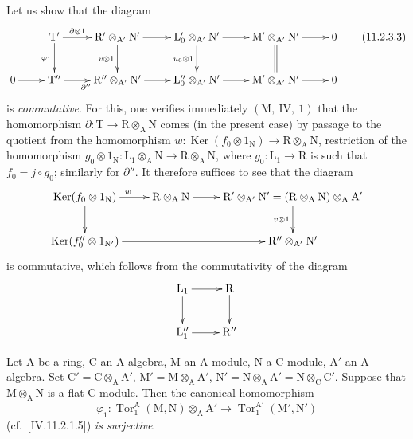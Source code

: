 
Let us show that the diagram
\begin{equation}
\xymatrix{
  & \mathrm{T}' \ar[r]^-{\partial\otimes 1} \ar[d]_{\varphi_1} & \mathrm{R}'\otimes_{\mathrm{A}'}\mathrm{N}' \ar[r] \ar[d]_{v\otimes 1} & \mathrm{L}'_0\otimes_{\mathrm{A}'}\mathrm{N}' \ar[r] \ar[d]_{u_0\otimes 1} & \mathrm{M}'\otimes_{\mathrm{A}'}\mathrm{N}' \ar[r] \ar@{=}[d] & 0 \\
  0 \ar[r] & \mathrm{T}'' \ar[r]_{\partial''} & \mathrm{R}''\otimes_{\mathrm{A}'}\mathrm{N}' \ar[r] & \mathrm{L}''_0\otimes_{\mathrm{A}'}\mathrm{N}' \ar[r] & \mathrm{M}'\otimes_{\mathrm{A}'}\mathrm{N}' \ar[r] & 0
}
  \label{IV.11.2.3.3}
\tag{11.2.3.3}
\end{equation}
is \emph{commutative}. For this, one verifies immediately $(\mathrm{M},~\mathrm{IV},~1)$ that the homomorphism $\partial:\mathrm{T}\to\mathrm{R}\otimes_\mathrm{A}\mathrm{N}$ comes (in the present case) by passage to the quotient from the homomorphism $w:\operatorname{Ker}(f_0\otimes 1_\mathrm{N})\to\mathrm{R}\otimes_\mathrm{A}\mathrm{N}$, restriction of the homomorphism $g_0\otimes 1_\mathrm{N}:\mathrm{L}_1\otimes_\mathrm{A}\mathrm{N}\to\mathrm{R}\otimes_\mathrm{A}\mathrm{N}$, where $g_0:\mathrm{L}_1\to\mathrm{R}$ is such that $f_0=j\circ g_0$; similarly for $\partial''$. It therefore suffices to see that the diagram
\[
\xymatrix{
  \operatorname{Ker}(f_0\otimes 1_\mathrm{N}) \ar[r]^{w} \ar[d] & \mathrm{R}\otimes_\mathrm{A}\mathrm{N} \ar[r] & \mathrm{R}'\otimes_{\mathrm{A}'}\mathrm{N}'=(\mathrm{R}\otimes_\mathrm{A}\mathrm{N})\otimes_\mathrm{A}\mathrm{A}' \ar[d]_{v\otimes 1} \\
  \operatorname{Ker}(f''_0\otimes 1_{\mathrm{N}'}) \ar[rr] & & \mathrm{R}''\otimes_{\mathrm{A}'}\mathrm{N}'
}
\]
is commutative, which follows from the commutativity of the diagram
\[
\xymatrix{
  \mathrm{L}_1 \ar[r] \ar[d] & \mathrm{R} \ar[d] \\
  \mathrm{L}''_1 \ar[r] & \mathrm{R}''
}
\]

\begin{lemma}[11.2.4]
\label{IV.11.2.4}
Let $\mathrm{A}$ be a ring, $\mathrm{C}$ an $\mathrm{A}$-algebra, $\mathrm{M}$ an $\mathrm{A}$-module, $\mathrm{N}$ a $\mathrm{C}$-module, $\mathrm{A}'$ an $\mathrm{A}$-algebra. Set $\mathrm{C}'=\mathrm{C}\otimes_\mathrm{A}\mathrm{A}'$, $\mathrm{M}'=\mathrm{M}\otimes_\mathrm{A}\mathrm{A}'$, $\mathrm{N}'=\mathrm{N}\otimes_\mathrm{A}\mathrm{A}'=\mathrm{N}\otimes_\mathrm{C}\mathrm{C}'$. Suppose that $\mathrm{M}\otimes_\mathrm{A}\mathrm{N}$ is a flat $\mathrm{C}$-module. Then the canonical homomorphism
\[
  \varphi_1:\operatorname{Tor}_1^\mathrm{A}(\mathrm{M},\mathrm{N})\otimes_\mathrm{A}\mathrm{A}'\to\operatorname{Tor}_1^{\mathrm{A}'}(\mathrm{M}',\mathrm{N}')
\]
(cf.\ [IV.11.2.1.5]) \emph{is surjective}.
\end{lemma}

